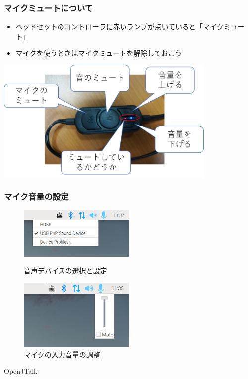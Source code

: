 \documentclass[14pt]{beamer}
\begin{document}
\begin{frame}
  \frametitle{マイクミュートについて}
  \begin{itemize}
    \item ヘッドセットのコントローラに赤いランプが点いていると「マイクミュート」
    \item マイクを使うときはマイクミュートを解除しておこう
  \end{itemize}
  \centering
  \includegraphics[width=0.8\textwidth]{chap06/text06-img004.png}
\end{frame}

\begin{frame}
  \frametitle{マイク音量の設定}

  \begin{figure}
    \centering
    \includegraphics[width=0.5\textwidth]{select_sink.png}
    \caption{音声デバイスの選択と設定}
    \includegraphics[width=0.5\textwidth]{microphone_volume.png}
    \caption{マイクの入力音量の調整}
  \end{figure}

\end{frame}

\begin{frame}
  \centering
  {\Large OpenJTalk}
\end{frame}
\end{document}
